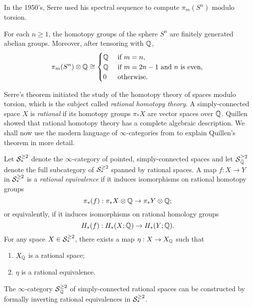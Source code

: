 In the 1950's, Serre used his spectral sequence to compute $\pi_m(S^n)$ modulo torsion.
\begin{theorem}
[Serre]
    For each $n\geq 1$, the homotopy groups of the sphere $S^n$ are finitely generated abelian groups.
    Moreover, after tensoring with ${\mathbb{Q}}$, 
    \[
    \pi_m (S^n)\otimes {\mathbb{Q}} \cong
    \begin{cases}
    {\mathbb{Q}} & \text{ if $m=n$,}\\
    {\mathbb{Q}} & \text{ if $m=2n-1$ and $n$ is even,}\\
    0   & \text{ otherwise.}
    \end{cases}
    \]
\end{theorem}

Serre's theorem initiated the study of the homotopy theory of spaces modulo torsion, which is the subject called \emph{rational homotopy theory}. A simply-connected space $X$ is \emph{rational} if its homotopy groups $\pi_* X$ are vector spaces over ${\mathbb{Q}}$.
Quillen \cite{Quillen_RHT} showed that rational homotopy theory has a complete algebraic description. 
We shall now use the modern language of $\infty$-categories from \cite{HTT} to explain Quillen's theorem in more detail.

Let ${\mathcal{S}}^{\geq 2}_*$ denote the $\infty$-category of pointed, simply-connected spaces and let $\operatorname{\mathcal{S}}^{\geq 2}_{{\mathbb{Q}}}$ denote the full subcategory of ${\mathcal{S}}^{\geq 2}_*$ spanned by rational spaces.
A map $f:X\to Y$ in ${\mathcal{S}}^{\geq 2}_*$ is a \emph{rational equivalence} if it induces isomorphisms on rational homotopy groups
\[
\pi_*(f): \pi_*X \otimes {\mathbb{Q}} \to \pi_*Y \otimes {\mathbb{Q}};
\]
or equivalently, if it induces isomorphisms on rational homology groups
\[
H_*(f): H_*(X;{\mathbb{Q}})  \to H_*(Y;{\mathbb{Q}}).
\]
For any space $X\in {\mathcal{S}}^{\geq 2}_*$, there exists a map $\eta:X\to X_{{\mathbb{Q}}}$ such that
\begin{enumerate}
    \item $X_{{\mathbb{Q}}}$ is a rational space;
    \item $\eta$ is a rational equivalence.
\end{enumerate}
The $\infty$-category $\operatorname{\mathcal{S}}^{\geq 2}_{{\mathbb{Q}}}$ of simply-connected rational spaces can be constructed by formally inverting rational equivalences in ${\mathcal{S}}^{\geq 2}_*$.

